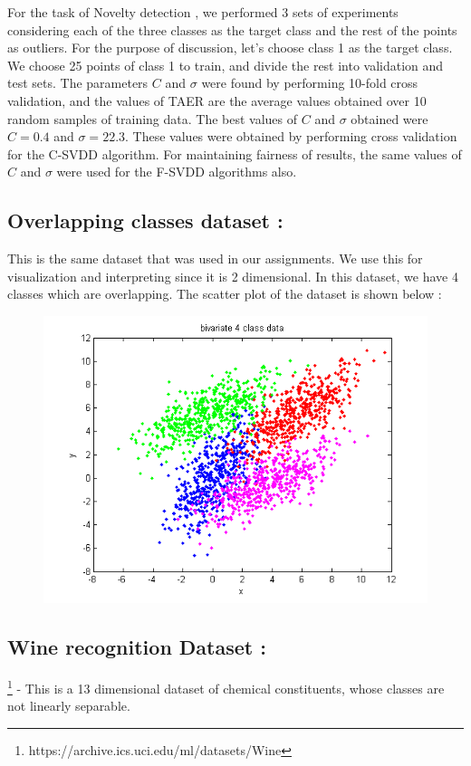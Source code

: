 \documentclass{article} %
\begin{document}
For the task of Novelty detection , we performed 3 sets of experiments considering each of the three classes as the target class and the rest of the points as outliers. For the purpose of discussion, let's choose class 1 as the target class. We choose 25 points of class 1 to train, and divide the rest into validation and test sets. The parameters $C$ and $\sigma$ were found by performing 10-fold cross validation, and the values of TAER are the average values obtained over 10 random samples of training data. The best values of $C$ and $\sigma$ obtained were $C = 0.4$ and $\sigma = 22.3$. These values were obtained by performing cross validation for the C-SVDD algorithm. For maintaining fairness of results, the same values of $C$ and $\sigma$ were used for the F-SVDD algorithms also.

\subsection{Overlapping classes dataset :} This is the same dataset that was used in our assignments. We use this for visualization and interpreting since it is 2 dimensional. In this dataset, we have 4 classes which are overlapping. The scatter plot of the dataset is shown below :

\begin{figure}
  \centering
  \includegraphics[width=\linewidth]{../Code/overlapping/svdd/data}
\end{figure}


\subsection{Wine recognition Dataset :}\footnote{https://archive.ics.uci.edu/ml/datasets/Wine}  - This is a 13 dimensional dataset of chemical constituents, whose classes are not linearly separable. 
\end{document}
